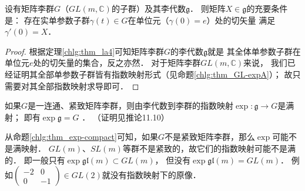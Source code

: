 \begin{proposition}\label{chlg:thm_MatrixG-gexp}
    设有矩阵李群$G$（$GL(m,\mathbb{C})$的子群）及其李代数$\mathfrak{g}$．
    则矩阵$X\in \mathfrak{g}$的充要条件是：
    存在实单参数子群$\gamma(t)\in G$在单位元（$\gamma(0)=e$）处的切矢量
    满足$\gamma'(0)=X$．
\end{proposition}
\begin{proof}
根据定理\ref{chlg:thm_la4}可知矩阵李群$G$的李代数$\mathfrak{g}$就是
其全体单参数子群在单位元$e$处的切矢量的集合，反之亦然．
对于矩阵李群$GL(m,\mathbb{C})$来说，
我们已经证明其全部单参数子群皆有指数映射形式（见命题\ref{chlg:thm_GL-expA}）；
故只需要对其全部指数映射求导即可．
\end{proof}


\begin{proposition}\label{chlg:thm_exp-compact}
    如果$G$是一连通、紧致矩阵李群，则由李代数到李群的指数映射$\exp:\mathfrak{g}\to G$是满射；
    即有$\exp \mathfrak{g} = G$ ．
    （证明见\parencite[\S 11.2]{hall-2015}推论11.10）
\end{proposition}

从命题\ref{chlg:thm_exp-compact}可知，如果$G$不是紧致矩阵李群，那么$\exp$可能不是满映射．
$GL(m)$、$SL(m)$等群不是紧致的，故它们的指数映射可能不是满的．
即一般只有$\exp \mathfrak{gl}(m) \subset GL(m)$，
但没有$\exp \mathfrak{gl}(m) = GL(m)$．
例如$\left(\begin{smallmatrix} -2 & 0\\0 & -1\end{smallmatrix}\right) \in GL(2)$就没有指数映射下的原像．


%    





